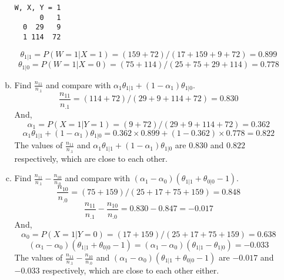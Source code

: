 \begin{enumerate}
\begin{enumerate}[(a)]
\begin{lstlisting}
W, X, Y = 1
      0   1
  0  29   9
  1 114  72
\end{lstlisting}
\[\theta_{1|1}=P(W=1|X=1)=(159+72)/(17+159+9+72)=0.899\]
\[\theta_{1|0}=P(W=1|X=0)=(75+114)/(25+75+29+114)=0.778\]
\item Find $\frac{n_{11}}{n_{.1}}$ and compare with $\alpha_1\theta_{1|1}+(1-\alpha_1)\theta_{1|0}$.
\[\frac{n_{11}}{n_{.1}}=(114+72)/(29+9+114+72)= 0.830\] And, 
\[\alpha_1=P(X=1|Y=1)=(9+72)/(29+9+114+72)=0.362\]
\[\alpha_1\theta_{1|1}+(1-\alpha_1)\theta_{1|0}=0.362\times 0.899+(1-0.362)\times 0.778 = 0.822\]
The values of $\frac{n_{11}}{n_{.1}}$ and $\alpha_1\theta_{1|1}+(1-\alpha_1)\theta_{1|0}$ are $0.830$ and $0.822$ respectively, which are close to each other.

\item Find $\frac{n_{11}}{n_{.1}}-\frac{n_{10}}{n_{.0}}$ and compare with $(\alpha_1-\alpha_0)(\theta_{1|1}+\theta_{0|0}-1)$.
\[\frac{n_{10}}{n_{.0}}=(75+159)/(25+17+75+159)= 0.848\]
\[\frac{n_{11}}{n_{.1}}-\frac{n_{10}}{n_{.0}}= 0.830-0.847= -0.017\] And,
\[\alpha_0=P(X=1|Y=0)=(17+159)/(25+17+75+159)=0.638\]
\[(\alpha_1-\alpha_0)(\theta_{1|1}+\theta_{0|0}-1)=(\alpha_1-\alpha_0)(\theta_{1|1}-\theta_{1|0})=-0.033\]
The values of $\frac{n_{11}}{n_{.1}}-\frac{n_{10}}{n_{.0}}$ and $(\alpha_1-\alpha_0)(\theta_{1|1}+\theta_{0|0}-1)$ are $-0.017$ and $-0.033$ respectively, which are close to each other either.


\end{enumerate}
\end{enumerate}
